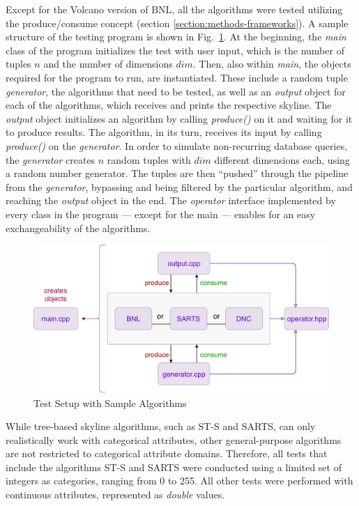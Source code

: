 Except for the Volcano version of BNL, all the algorithms were tested utilizing the produce/consume concept (section \ref{section:methods-frameworks}). A sample structure of the testing program is shown in Fig.~\ref{fig:test-setup}. 
At the beginning, the \textit{main} class of the program initializes the test with user input, which is the number of tuples $n$ and the number of dimensions $dim$. Then, also within \textit{main}, the objects required for the program to run, are instantiated. These include a random tuple \textit{generator}, the algorithms that need to be tested, as well as an \textit{output} object for each of the algorithms, which receives and prints the respective skyline. The \textit{output} object initializes an algorithm by calling \textit{produce()} on it and waiting for it to produce results. The algorithm, in its turn, receives its input by calling \textit{produce()} on the \textit{generator}. In order to simulate non-recurring database queries, the \textit{generator} creates $n$ random tuples with $dim$ different dimensions each, using a random number generator. The tuples are then ``pushed'' through the pipeline from the \textit{generator}, bypassing and being filtered by the particular algorithm, and reaching the\textit{ output} object in the end. The \textit{operator} interface implemented by every class in the program --- except for the main --- enables for an easy exchangeability of the algorithms. %

\begin{figure}[h]
\centering
\includegraphics[width=0.9\linewidth]{figures/test-setup}
\caption{Test Setup with Sample Algorithms}
\label{fig:test-setup}
\end{figure}

While tree-based skyline algorithms, such as ST-S and SARTS, can only realistically work with categorical attributes, other general-purpose algorithms are not restricted to categorical attribute domains. Therefore, all tests that include the algorithms ST-S and SARTS were conducted using a limited set of integers as categories, ranging from 0 to 255. All other tests were performed with continuous attributes, represented as \textit{double} values. 

